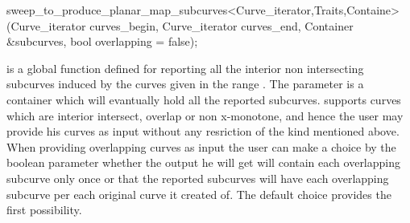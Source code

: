
\ccRefPageBegin


\begin{ccRefFunction}{sweep_to_produce_planar_map_subcurves<Curve_iterator,Traits,Containe>(Curve_iterator curves_begin, Curve_iterator curves_end, Container &subcurves, bool overlapping = false);}


\ccDefinition
{} is a global function defined for reporting all the  interior non intersecting subcurves induced by the curves given in the range \ccStyle{[curves_begin, curves_end)}. The parameter  is a container which will evantually hold all the reported subcurves.
 supports curves which are interior intersect, overlap or non x-monotone, and hence the user may provide his curves as input without any resriction of the kind mentioned above. When providing overlapping curves as input the user can make a choice by the boolean parameter  whether the output he will get will contain each overlapping subcurve only once or that the reported subcurves will have each overlapping subcurve per each original curve it created of. The default choice provides the first possibility.


\end{ccRefFunction} %

\ccRefPageEnd











